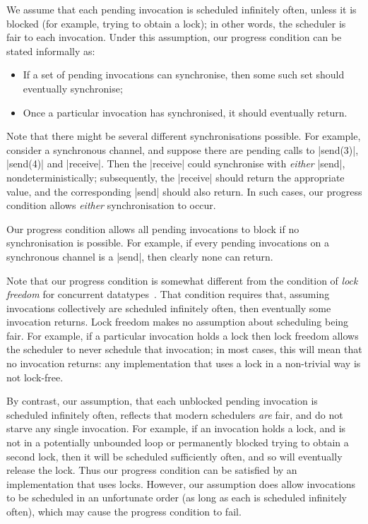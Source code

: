 We assume that each pending invocation is scheduled infinitely often, unless
it is blocked (for example, trying to obtain a lock); in other words, the
scheduler is fair to each invocation.  Under this assumption, our progress
condition can be stated informally as:
%
\begin{itemize}
\item If a set of pending invocations can synchronise, then some such set
  should eventually synchronise;

\item Once a particular invocation has synchronised, it should eventually
  return.
\end{itemize}
%
Note that there might be several different synchronisations possible.  For
example, consider a synchronous channel, and suppose there are pending calls
to |send(3)|, |send(4)| and |receive|.  Then the |receive| could synchronise
with \emph{either} |send|, nondeterministically; subsequently, the |receive|
should return the appropriate value, and the corresponding |send| should also
return.  In such cases, our progress condition allows \emph{either}
synchronisation to occur.

Our progress condition allows all pending invocations to block if no
synchronisation is possible.  For example, if every pending invocations on a
synchronous channel is a |send|, then clearly none can return.

Note that our progress condition is somewhat different from the condition of
\emph{lock freedom} for concurrent datatypes~\cite{herlihy-shavit}.  That
condition requires that, assuming invocations collectively are scheduled
infinitely often, then eventually some invocation returns.  Lock freedom makes
no assumption about scheduling being fair.  For example, if a particular
invocation holds a lock then lock freedom allows the scheduler to never
schedule that invocation; in most cases, this will mean that no invocation
returns: any implementation that uses a lock in a non-trivial way is not
lock-free.

By contrast, our assumption, that each unblocked pending invocation is
scheduled infinitely often, reflects that modern schedulers \emph{are} fair,
and do not starve any single invocation.  For example, if an invocation holds
a lock, and is not in a potentially unbounded loop or permanently blocked
trying to obtain a second lock, then it will be scheduled sufficiently often,
and so will eventually release the lock.  Thus our progress condition can be
satisfied by an implementation that uses locks.  However, our assumption does
allow invocations to be scheduled in an unfortunate order (as long as each is
scheduled infinitely often), which may cause the progress condition to fail.

